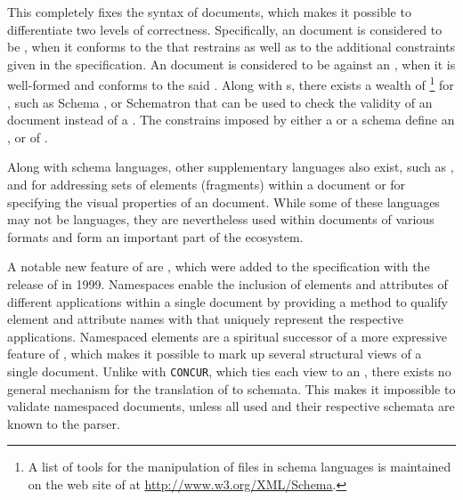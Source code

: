 \documentclass{book}
\begin{document}
This  completely fixes the syntax of  documents, which
makes it possible to differentiate two levels of correctness. Specifically, an
 document is considered to be %
, when it conforms to the 
 that restrains  as well as to the additional
constraints given in the specification. An  document is
considered to be   against an
 , when it is well-formed and conforms to the said
 .  Along with s, there exists a wealth
of \footnote{
  A list of tools for the manipulation of files in  schema
  languages is maintained on the web site of  at
  \url{http://www.w3.org/XML/Schema}.
} for , such as   Schema
,  or Schematron that can be used to
check the validity of an  document instead of a .
The constrains imposed by either a  or a schema define an
,  or 
 
 of .

Along with schema languages, other supplementary languages also exist, such as
,  and  for addressing sets of elements
(fragments) within a  document or  for specifying the
visual properties of an  document. While some of these languages
may not be  languages, they are nevertheless used within documents
of various  formats and form an important part of the
 ecosystem.

A notable new feature of  are %
, which were added to the specification with the
release of \cite{bray99} in 1999. Namespaces enable the inclusion of elements
  and attributes of different  applications within a single
 document by providing a method to qualify element and attribute
names with  that uniquely represent the respective 
applications. Namespaced elements are a spiritual successor of a more expressive
 feature of , which makes it possible to mark
up several structural views of a single document.  Unlike with \texttt{CONCUR},
which ties each view to an  , there exists no
general mechanism for the translation of  to  schemata.
This makes it impossible to validate namespaced  documents, unless
all used  and their respective schemata are known to the parser.
\end{document}
